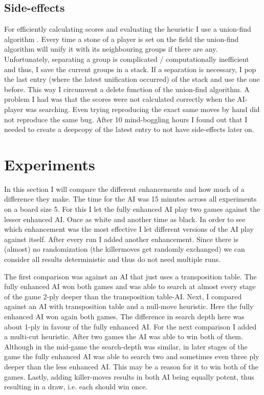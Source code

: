 \documentclass[a4paper]{article}
\begin{document}
\subsection{Side-effects}
For efficiently calculating scores and evaluating the heuristic I use a union-find algorithm \cite{galler1964improved}. Every time a stone of a player is set on the field the union-find algorithm will unify it with its neighbouring groups if there are any. Unfortunately, separating a group is complicated / computationally inefficient and thus, I save the current groups in a stack. If a separation is necessary, I pop the last entry (where the latest unification occurred) of the stack and use the one before. This way I circumvent a delete function of the union-find algorithm.
A problem I had was that the scores were not calculated correctly when the AI-player was searching. Even trying reproducing the exact same moves by hand did not reproduce the same bug. After 10 mind-boggling hours I found out that I needed to create a deepcopy of the latest entry to not have side-effects later on.

\section{Experiments}
In this section I will compare the different enhancements and how much of a difference they make. The time for the AI was 15 minutes across all experiments on a board size 5. For this I let the fully enhanced AI play two games against the lesser enhanced AI. Once as white and another time as black.
In order to see which enhancement was the most effective I let different versions of the AI play against itself. After every run I added another enhancement. Since there is (almost) no randomization (the killermoves get randomly exchanged) we can consider all results deterministic and thus do not need multiple runs.

The first comparison was against an AI that just uses a transposition table. The fully enhanced AI won both games and was able to search at almost every stage of the game 2-ply deeper than the transposition table-AI.
Next, I compared against an AI with transposition table and a null-move heuristic. Here the fully enhanced AI won again both games. The difference in search depth here was about 1-ply in favour of the fully enhanced AI.
For the next comparison I added a multi-cut heuristic. After two games the AI was able to win both of them. Although in the mid-game the search-depth was similar, in later stages of the game the fully enhanced AI was able to search two and sometimes even three ply deeper than the less enhanced AI. This may be a reason for it to win both of the games.
Lastly, adding killer-moves results in both AI being equally potent, thus resulting in a draw, i.e. each should win once.



\end{document}
